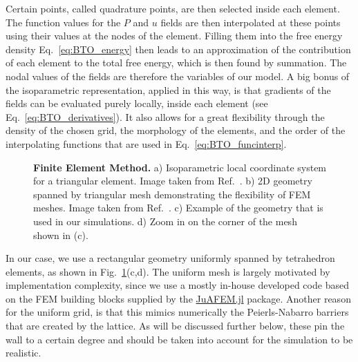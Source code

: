 Certain points, called quadrature points, are then selected inside each element.
The function values for the $P$ and $u$ fields are then interpolated at these points using their values at the nodes of the element.
Filling them into the free energy density Eq.~\ref{eq:BTO_energy} then leads to an approximation of the contribution of each element to the total free energy, which is then found by summation. 
The nodal values of the fields are therefore the variables of our model. 
A big bonus of the isoparametric representation, applied in this way, is that gradients of the fields can be evaluated purely locally, inside each element (see Eq.~\ref{eq:BTO_derivatives}).
It also allows for a great flexibility through the density of the chosen grid, the morphology of the elements, and the order of the interpolating functions that are used in Eq.~\ref{eq:BTO_funcinterp}.

\begin{figure}[h!]
	\caption{\label{fig:BTO_fem}{\bf Finite Element Method.} a) Isoparametric local coordinate system for a triangular element. Image taken from Ref.~\cite{Biner}. b) 2D geometry spanned by triangular mesh demonstrating the flexibility of FEM meshes. Image taken from Ref.~\cite{2Dmesh}. c) Example of the geometry that is used in our simulations. d) Zoom in on the corner of the mesh shown in (c).}
\end{figure}

In our case, we use a rectangular geometry uniformly spanned by tetrahedron elements, as shown in Fig.~\ref{fig:BTO_fem}(c,d).
The uniform mesh is largely motivated by implementation complexity, since we use a mostly in-house developed code based on the FEM building blocks supplied by the \href{https://github.com/KristofferC/JuAFEM.jl}{JuAFEM.jl} package.
Another reason for the uniform grid, is that this mimics numerically the Peierls-Nabarro barriers that are created by the lattice.
As will be discussed further below, these pin the wall to a certain degree and should be taken into account for the simulation to be realistic.

